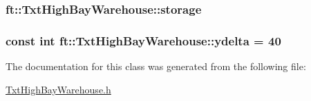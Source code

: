 \subsubsection[{\texorpdfstring{storage}{storage}}]{ ft\+::\+Txt\+High\+Bay\+Warehouse\+::storage\hspace{0.3cm}{\ttfamily [protected]}}\hypertarget{classft_1_1_txt_high_bay_warehouse_af7b1534ad416b0f0f86c2792e2982a4f}{}\label{classft_1_1_txt_high_bay_warehouse_af7b1534ad416b0f0f86c2792e2982a4f}
\subsubsection[{\texorpdfstring{ydelta}{ydelta}}]{\setlength{\rightskip}{0pt plus 5cm}const int ft\+::\+Txt\+High\+Bay\+Warehouse\+::ydelta = 40}\hypertarget{classft_1_1_txt_high_bay_warehouse_acfdcf3b84851e9315c7e243c8fbda76d}{}\label{classft_1_1_txt_high_bay_warehouse_acfdcf3b84851e9315c7e243c8fbda76d}


The documentation for this class was generated from the following file\+:\begin{DoxyCompactItemize}
\item 
\hyperlink{_txt_high_bay_warehouse_8h}{Txt\+High\+Bay\+Warehouse.\+h}\end{DoxyCompactItemize}
